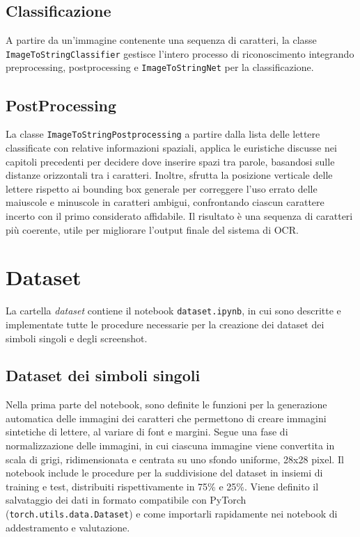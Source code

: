 \subsection{Classificazione}
A partire da un'immagine contenente una sequenza di caratteri, la classe \texttt{ImageToStringClassifier} gestisce l'intero processo di riconoscimento integrando preprocessing, postprocessing e \texttt{ImageToStringNet} per la classificazione.

\subsection{PostProcessing}
La classe \texttt{ImageToStringPostprocessing} a partire dalla lista delle lettere classificate con relative informazioni spaziali, applica le euristiche discusse nei capitoli precedenti per decidere dove inserire spazi tra parole, basandosi sulle distanze orizzontali tra i caratteri. Inoltre, sfrutta la posizione verticale delle lettere rispetto ai bounding box generale per correggere l'uso errato delle maiuscole e minuscole in caratteri ambigui, confrontando ciascun carattere incerto con il primo considerato affidabile. Il risultato è una sequenza di caratteri più coerente, utile per migliorare l'output finale del sistema di OCR.

\section{Dataset}
La cartella \emph{dataset} contiene il notebook \texttt{dataset.ipynb}, in cui sono descritte e implementate tutte le procedure necessarie per la creazione dei dataset dei simboli singoli e degli screenshot.
\subsection{Dataset dei simboli singoli}
Nella prima parte del notebook, sono definite le funzioni per la generazione automatica delle immagini dei caratteri che permettono di creare immagini sintetiche di lettere, al variare di font e margini.
Segue una fase di normalizzazione delle immagini, in cui ciascuna immagine viene convertita in scala di grigi, ridimensionata e centrata su uno sfondo uniforme, 28x28 pixel. Il notebook include le procedure per la suddivisione del dataset in insiemi di training e test, distribuiti rispettivamente in 75\% e 25\%.
Viene definito il salvataggio dei dati in formato compatibile con PyTorch (\texttt{torch.utils.data.Dataset}) e come importarli rapidamente nei notebook di addestramento e valutazione.
